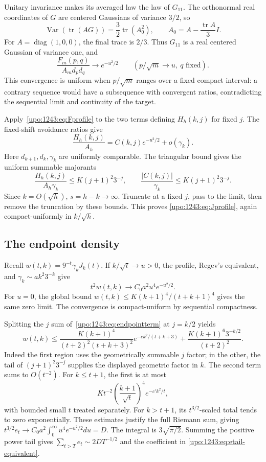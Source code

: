 \documentclass[11pt,letterpaper]{article}
\theoremstyle{remark}\newtheorem{remark}[theorem]{Remark}
\numberwithin{equation}{section}
\begin{document}
Unitary invariance makes its averaged law the law of $G_{11}$. The
orthonormal real coordinates of $G$ are centered Gaussians of variance
$3/2$, so
\[
 \operatorname{Var}(\operatorname{tr}(AG))
 =\frac32\operatorname{tr}(A_0^2),\qquad
 A_0=A-\frac{\operatorname{tr}A}{3}I.
\]
For $A=\operatorname{diag}(1,0,0)$, the final trace is $2/3$.
Thus $G_{11}$ is a real centered Gaussian of variance one, and
\begin{equation}\label{upo:1243:eq:Fprofile}
 \frac{F_m(p,q)}{A_md_pd_q}\longrightarrow e^{-u^2/2}
 \qquad(p/\sqrt m\to u,\ q\text{ fixed}).
\end{equation}
This convergence is uniform when $p/\sqrt m$ ranges over a fixed compact
interval: a contrary sequence would have a subsequence with convergent
ratios, contradicting the sequential limit and continuity of the target.

Apply~\eqref{upo:1243:eq:Fprofile} to the two terms defining $H_h(k,j)$ for
fixed $j$. The fixed-shift avoidance ratios give
\[
 \frac{H_h(k,j)}{A_h}
   =C(k,j)e^{-u^2/2}+o(\gamma_k).
\]
Here $d_{k+1},d_k,\gamma_k$ are uniformly comparable. The triangular
bound gives the uniform summable majorants
\[
 \frac{H_h(k,j)}{A_h\gamma_k}\le K(j+1)^2 3^{-j},\qquad
 \frac{|C(k,j)|}{\gamma_k}\le K(j+1)^2 3^{-j}.
\]
Since $k=O(\sqrt h)$, $s=h-k\to\infty$. Truncate at a fixed $j$, pass
to the limit, then remove the truncation by these bounds. This proves
\eqref{upo:1243:eq:Jprofile}, again compact-uniformly in $k/\sqrt h$.

\subsection{The endpoint density}
Recall $w(t,k)=9^{-t}\gamma_kJ_k(t)$. If $k/\sqrt t\to u>0$, the
profile, Regev's equivalent, and $\gamma_k\sim ak^2 3^{-k}$ give
\begin{equation}\label{upo:1243:eq:wprofile}
 t^2w(t,k)\longrightarrow C_0a^2u^4e^{-u^2/2}.
\end{equation}
For $u=0$, the global bound
$w(t,k)\le K(k+1)^4/(t+k+1)^4$ gives the same zero limit.
The convergence is compact-uniform by sequential compactness.

Splitting the $j$ sum of~\eqref{upo:1243:eq:endpointterm} at $j=k/2$ yields
\begin{equation}\label{upo:1243:eq:wtail}
 w(t,k)\le
 \frac{K(k+1)^4}{(t+2)^2(t+k+3)^2}
          e^{-ck^2/(t+k+3)}
 +\frac{K(k+1)^6 3^{-k/2}}{(t+2)^2}.
\end{equation}
Indeed the first region uses the geometrically summable $j$ factor;
in the other, the tail of $(j+1)^2 3^{-j}$ supplies the displayed
geometric factor in $k$. The second term sums to $O(t^{-2})$.
For $k\le t+1$, the first is at most
\[
 Kt^{-2}\left(\frac{k+1}{\sqrt t}\right)^4e^{-c'k^2/t},
\]
with bounded small $t$ treated separately. For $k>t+1$, its
$t^{3/2}$-scaled total tends to zero exponentially.
These estimates justify the full Riemann sum, giving
$t^{3/2}e_t\to C_0a^2\int_0^\infty u^4e^{-u^2/2}du=D$.
The integral is $3\sqrt{\pi/2}$. Summing the positive power tail gives
$\sum_{t>T}e_t\sim2DT^{-1/2}$ and the coefficient in
\eqref{upo:1243:eq:etail-equivalent}.
\end{document}
